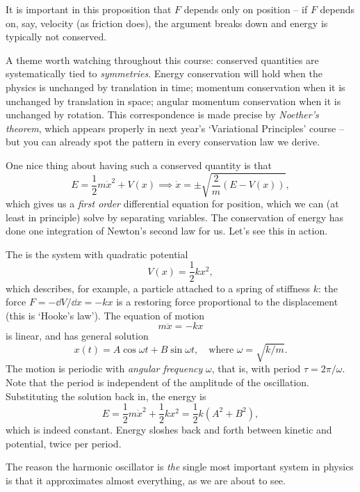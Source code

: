 It is important in this proposition that $F$ depends only on position -- if $F$ depends on, say, velocity (as friction does), the argument breaks down and energy is typically not conserved.

\begin{remark}
	A theme worth watching throughout this course: conserved quantities are systematically tied to \emph{symmetries}. Energy conservation will hold when the physics is unchanged by translation in time; momentum conservation when it is unchanged by translation in space; angular momentum conservation when it is unchanged by rotation. This correspondence is made precise by \emph{Noether's theorem}, which appears properly in next year's `Variational Principles' course -- but you can already spot the pattern in every conservation law we derive.
\end{remark}

One nice thing about having such a conserved quantity is that
$$
E = \frac{1}{2}m \dot{x}^2 + V(x) \implies  \dot{x} = \pm \sqrt{\frac{2}{m} (E - V(x))},
$$
which gives us a \emph{first order} differential equation for position, which we can (at least in principle) solve by separating variables. The conservation of energy has done one integration of Newton's second law for us. Let's see this in action.

\begin{example}
	The  is the system with quadratic potential
	$$
	V(x) = \frac{1}{2}k x^2,
	$$
	which describes, for example, a particle attached to a spring of stiffness $k$: the force $F = -\dd V/\dd x = -kx$ is a restoring force proportional to the displacement (this is `Hooke's law').
	The equation of motion
	$$
	m \ddot{x} = -kx
	$$
	is linear, and has general solution
	$$
	x(t) = A \cos \omega t + B \sin \omega t, \quad \text{where } \omega = \sqrt{k/m}.
	$$
	The motion is periodic with \emph{angular frequency} $\omega$, that is, with period $\tau = 2\pi/\omega$. Note that the period is independent of the amplitude of the oscillation.
	Substituting the solution back in, the energy is
	$$
	E = \frac{1}{2}m\dot{x}^2 + \frac{1}{2}kx^2 = \frac{1}{2}k(A^2 + B^2),
	$$
	which is indeed constant. Energy sloshes back and forth between kinetic and potential, twice per period.
\end{example}

The reason the harmonic oscillator is \emph{the} single most important system in physics is that it approximates almost everything, as we are about to see.

